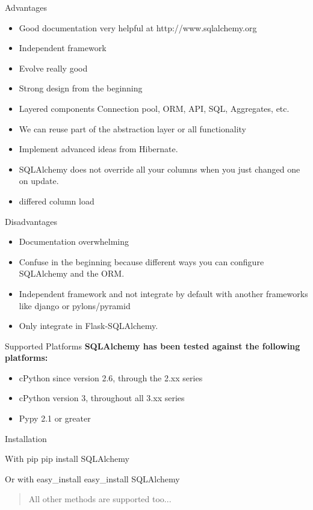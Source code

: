 \documentclass[seagull]{beamer}
\begin{document}
\begin{frame}{Advantages}
\begin{itemize}
	\item Good documentation very helpful at http://www.sqlalchemy.org
	\item Independent framework
	\item Evolve really good
	\item Strong design from the beginning
	\item Layered components Connection pool, ORM, API, SQL, Aggregates, etc.
	\item We can reuse part of the abstraction layer or all functionality
	\item Implement advanced ideas from Hibernate.
	\item SQLAlchemy does not override all your columns when you just changed one on update.
	\item differed column load
\end{itemize}
\end{frame}

\begin{frame}{Disadvantages}
\begin{itemize}
	\item Documentation overwhelming
	\item Confuse in the beginning because different ways you can configure SQLAlchemy and the ORM.
	\item Independent framework and not integrate by default with another frameworks like django or pylons/pyramid
	\item Only integrate in Flask-SQLAlchemy.
\end{itemize}
\end{frame}

\begin{frame}{Supported Platforms}
	\textbf{SQLAlchemy has been tested against the following platforms:}
	\begin{itemize}
		\item cPython since version 2.6, through the 2.xx series
		\item cPython version 3, throughout all 3.xx series
		\item Pypy 2.1 or greater
	\end{itemize}
\end{frame}
\begin{frame}{Installation}
	\begin{block}{With pip}
		pip install SQLAlchemy
	\end{block} 
	\begin{block}{Or with easy\_install}
		easy\_install SQLAlchemy
	\end{block}
	\begin{quote}
	All other methods are supported too...
	\end{quote}
\end{frame}
\end{document}
